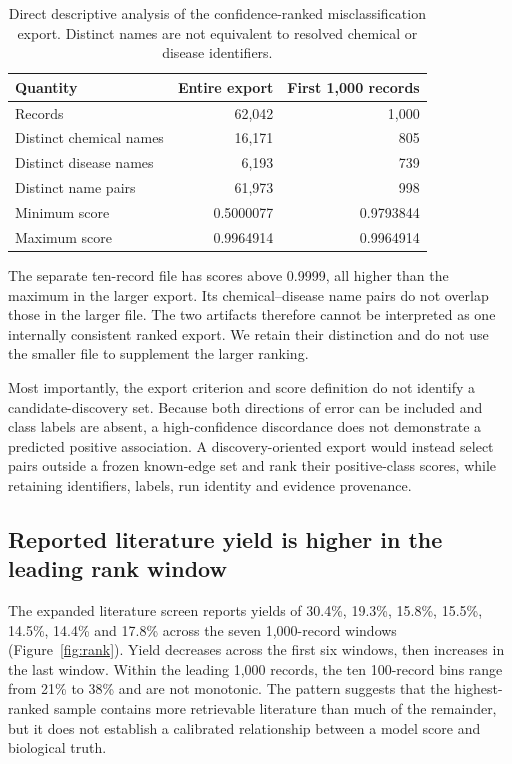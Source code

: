 \begin{table}[htbp]
\centering\small
\caption{Direct descriptive analysis of the confidence-ranked misclassification export. Distinct names are not equivalent to resolved chemical or disease identifiers.}
\label{tab:export}
\begin{tabular}{lrr}
\toprule
Quantity & Entire export & First 1,000 records \\
\midrule
Records & 62,042 & 1,000 \\
Distinct chemical names & 16,171 & 805 \\
Distinct disease names & 6,193 & 739 \\
Distinct name pairs & 61,973 & 998 \\
Minimum score & 0.5000077 & 0.9793844 \\
Maximum score & 0.9964914 & 0.9964914 \\
\bottomrule
\end{tabular}
\end{table}

The separate ten-record file has scores above 0.9999, all higher than the maximum in the larger export. Its chemical--disease name pairs do not overlap those in the larger file. The two artifacts therefore cannot be interpreted as one internally consistent ranked export. We retain their distinction and do not use the smaller file to supplement the larger ranking.

Most importantly, the export criterion and score definition do not identify a candidate-discovery set. Because both directions of error can be included and class labels are absent, a high-confidence discordance does not demonstrate a predicted positive association. A discovery-oriented export would instead select pairs outside a frozen known-edge set and rank their positive-class scores, while retaining identifiers, labels, run identity and evidence provenance.

\subsection{Reported literature yield is higher in the leading rank window}
The expanded literature screen reports yields of 30.4\%, 19.3\%, 15.8\%, 15.5\%, 14.5\%, 14.4\% and 17.8\% across the seven 1,000-record windows (Figure~\ref{fig:rank}). Yield decreases across the first six windows, then increases in the last window. Within the leading 1,000 records, the ten 100-record bins range from 21\% to 38\% and are not monotonic. The pattern suggests that the highest-ranked sample contains more retrievable literature than much of the remainder, but it does not establish a calibrated relationship between a model score and biological truth.

